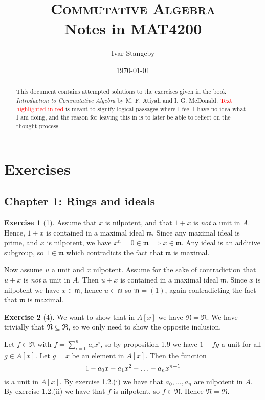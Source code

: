 \documentclass{article}
\title{\textsc{Commutative Algebra} \\
Notes in MAT4200}
\author{Ivar Stangeby}
\date{\today}
\theoremstyle{definition}
\newtheorem*{exercise}{Exercise}
\begin{document}
\maketitle

\begin{abstract}
This document contains attempted solutions to the exercises given in the book
\emph{Introduction to Commutative Algebra} by M. F. Atiyah and I. G. McDonald.
\textcolor{red}{Text highlighted in red} is meant to signify logical passages
where I feel I have no idea what I am doing, and the reason for leaving this in
is to later be able to reflect on the thought process.
\end{abstract}
\tableofcontents

\section{Exercises}
\label{sec:exercises_chapter_1}

\subsection{Chapter 1: Rings and ideals}
\label{sub:chapter_1}

\begin{exercise}[1]
    Assume that $x$ is nilpotent, and that $1 + x$ is \emph{not} a
    unit in $A$. Hence, $1 + x$ is contained in a maximal ideal
    $\mathfrak{m}$. Since any maximal ideal is prime, and $x$ is
    nilpotent, we have $x^n = 0 \in \mathfrak{m} \implies x \in
    \mathfrak{m}$. Any ideal is an additive subgroup, so $1 \in
    \mathfrak{m}$ which contradicts the fact that $\mathfrak{m}$ is
    maximal.

    Now assume $u$ a unit and $x$ nilpotent. Assume for the sake of
    contradiction that $u + x$ is \emph{not} a unit in $A$. Then $u +
    x$ is contained in a maximal ideal $\mathfrak{m}$. Since $x$ is
    nilpotent we have $x \in \mathfrak{m}$, hence $u \in \mathfrak{m}$
    so $\mathfrak{m} = (1)$, again contradicting the fact that
    $\mathfrak{m}$ is maximal.
\end{exercise}

\begin{exercise}[4]
    We want to show that in $A[x]$ we have $\mathfrak{N} =
    \mathfrak{R}$. We have trivially that $\mathfrak{N} \subseteq
    \mathfrak{R}$, so we only need to show the opposite inclusion.

    Let $f \in \mathfrak{R}$ with $f = \sum^{n}_{i=0} a_ix^i$, so by
    proposition 1.9 we have $1 - fg$ a unit for all $g \in A[x]$. Let
    $g = x$ be an element in $A[x]$. Then the function
    \begin{equation}
        \notag
        1 - a_0x - a_1x^2 - \ldots - a_nx^{n+1}
    \end{equation}
    is a unit in $A[x]$. By exercise 1.2.(i) we have that $a_0, \ldots
    ,a_n$ are nilpotent in $A$. By exercise 1.2.(ii) we have that $f$
    is nilpotent, so $f \in \mathfrak{N}$. Hence $\mathfrak{N} =
    \mathfrak{R}$.
\end{exercise}
\end{document}
